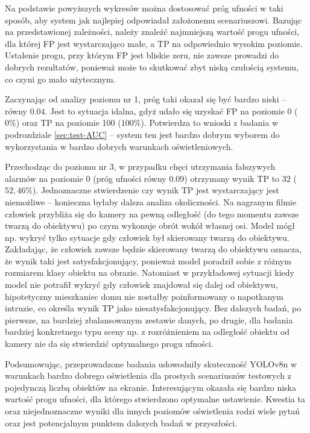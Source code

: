 Na podstawie powyższych wykresów można dostosować próg ufności w taki sposób, aby system jak najlepiej odpowiadał założonemu scenariuszowi. Bazując na przedstawionej zależności, należy znaleźć najmniejszą wartość progu ufności, dla której FP jest wystarczająco małe, a TP na odpowiednio wysokim poziomie. Ustalenie progu, przy którym FP jest bliskie zeru, nie zawsze prowadzi do dobrych rezultatów, ponieważ może to skutkować zbyt niską czułością systemu, co czyni go mało użytecznym.

Zaczynając od analizy poziomu nr 1, próg taki okazał się być bardzo niski -- równy $0.04$. Jest to sytuacja idalna, gdyż udało się uzyskać FP na poziomie 0 ($0\%$) oraz TP na poziomie 100 ($100\%$). Potwierdza to wnioski z badania w podrozdziale \ref{sec:test-AUC} -- system ten jest bardzo dobrym wyborem do wykorzystania w bardzo dobrych warunkach oświetleniowych.

Przechodząc do poziomu nr 3, w przypadku chęci utrzymania fałszywych alarmów na poziomie $0$ (próg ufności równy $0.09$) otrzymany wynik TP to $32$ ($52,46\%$). Jednoznaczne stwierdzenie czy wynik TP jest wystarczający jest niemożliwe --  konieczna byłaby dalsza analiza okoliczności. Na nagranym filmie człowiek przybliża się do kamery na pewną odległość (do tego momentu zawsze twarzą do obiektywu) po czym wykonuje obrót wokół własnej osi.
Model mógł np. wykryć tylko sytuacje gdy człowiek był skierowany twarzą do obiektywu. Zakładając, że człowiek zawsze będzie skierowany twarzą do obiektywu oznacza, że wynik taki jest satysfakcjonujący, ponieważ model poradził sobie z różnym rozmiarem klasy obiektu na obrazie. Natomiast w przykładowej sytuacji kiedy model nie potrafił wykryć gdy człowiek znajdował się dalej od obiektywu, hipotetyczny mieszkaniec domu nie zostałby poinformowany o napotkanym intruzie, co określa wynik TP jako niesatysfakcjonujący. Bez dalszych badań, po pierwsze, na bardziej zbalansowanym zestawie danych, po drugie, dla badania bardziej konkretnego typu sceny np. z rozróżnieniem na odległość obiektu od kamery nie da się stwierdzić optymalnego progu ufności.

Podsumowując, przeprowadzone badania udowodniły skuteczność YOLOv8n w warunkach bardzo dobrego oświetlenia dla prostych scenariuszów testowych z pojedynczą liczbą obiektów na ekranie. Interesującym okazała się bardzo niska wartość progu ufności, dla którego stwierdzono optymalne ustawienie. Kwestia ta oraz niejednoznaczne wyniki dla innych poziomów oświetlenia rodzi wiele pytań oraz jest potencjalnym punktem dalszych badań w przyszłości.





